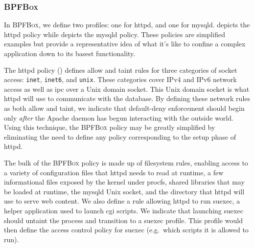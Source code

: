 \documentclass[
  fontsize=12pt,
  titlepage=firstiscover,
  paper=letter,
oneside,
  cleardoublepage=plain,
  parskip=half-,
  DIV=10,
  parindent,
  appendixprefix,
  chapterprefix,
  listof=totoc,
]{scrbook}
\newcommand{\bpfbox}{\textsc{BPFBox}}
\begin{document}
\subsubsection{\bpfbox{}}

In \bpfbox{}, we define two profiles: one for httpd, and one for mysqld.
 depicts the httpd policy while  depicts
the mysqld policy. These policies are simplified examples but provide a representative
idea of what it's like to confine a complex application down to its basest functionality.

The httpd policy () defines allow and taint rules for three
categories of socket access: \texttt{inet}, \texttt{inet6}, and \texttt{unix}. These
categories cover IPv4 and IPv6 network access as well as \gls{ipc} over a Unix domain
socket. This Unix domain socket is what httpd will use to communicate with the database.
By defining these network rules as both allow and taint, we indicate that default-deny
enforcement should begin only \textit{after} the Apache daemon has begun interacting with
the outside world. Using this technique, the \bpfbox{} policy may be greatly simplified by
eliminating the need to define any policy corresponding to the setup phase of httpd.

The bulk of the \bpfbox{} policy is made up of filesystem rules, enabling access to
a variety of configuration files that httpd needs to read at runtime, a few informational
files exposed by the kernel under procfs, shared libraries that may be loaded at runtime,
the mysqld Unix socket, and the directory that httpd will use to serve web content. We
also define a rule allowing httpd to run suexec, a helper application used to launch
\gls{cgi} scripts.  We indicate that launching suexec should untaint the process and
transition to a suexec profile.  This profile would then define the access control policy
for suexec (e.g.\ which scripts it is allowed to run).
\end{document}
